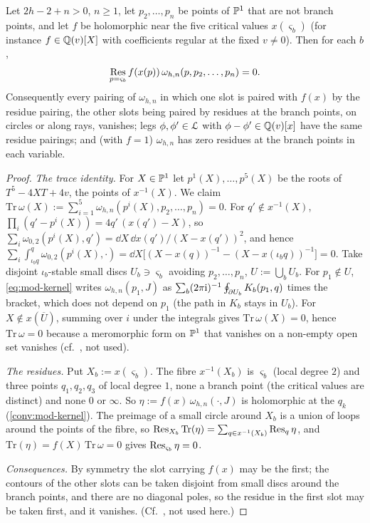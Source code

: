 \begin{lem}
\label{lem:mod-xfun}
Let $2h-2+n>0$, $n\geq 1$, let $p_2,\dots,p_n$ be points of $\mathbb{P}^1$ that are not branch points, and let $f$ be holomorphic near the five critical values $x(\varsigma_b)$ (for instance $f\in\mathbb{Q}(v)[X]$ with coefficients regular at the fixed $v\neq0$). Then for each $b$,
\[
\operatorname*{Res}_{p=\varsigma_b}f(x(p))\,\omega_{h,n}(p,p_2,\dots,p_n)=0 .
\]
Consequently every pairing of $\omega_{h,n}$ in which one slot is paired with $f(x)$ by the residue pairing, the other slots being paired by residues at the branch points, on circles or along rays, vanishes; legs $\phi,\phi'\in\mathcal{L}$ with $\phi-\phi'\in\mathbb{Q}(v)[x]$ have the same residue pairings; and (with $f=1$) $\omega_{h,n}$ has zero residues at the branch points in each variable.
\end{lem}

\begin{proof}
\emph{The trace identity.} For $X\in\mathbb{P}^1$ let $p^1(X),\dots,p^5(X)$ be the roots of $T^5-4XT+4v$, the points of $x^{-1}(X)$. We claim $\mathrm{Tr}\,\omega(X):=\sum_{i=1}^5\omega_{h,n}(p^i(X),p_2,\dots,p_n)=0$. For $q'\notin x^{-1}(X)$, $\prod_i(q'-p^i(X))=4q'\,(x(q')-X)$, so $\sum_i\omega_{0,2}(p^i(X),q')=\dd X\,\dd x(q')/(X-x(q'))^2$, and hence $\sum_i\int_{\iota_bq}^q\omega_{0,2}(p^i(X),\cdot)=\dd X\big[(X-x(q))^{-1}-(X-x(\iota_bq))^{-1}\big]=0$. Take disjoint $\iota_b$-stable small discs $U_b\ni\varsigma_b$ avoiding $p_2,\dots,p_n$, $U:=\bigcup_bU_b$. For $p_1\notin U$, \eqref{eq:mod-kernel} writes $\omega_{h,n}(p_1,J)$ as $\sum_b(2\pi\mathrm{i})^{-1}\oint_{\partial U_b}K_b(p_1,q)$ times the bracket, which does not depend on $p_1$ (the path in $K_b$ stays in $U_b$). For $X\notin x(\overline U)$, summing over $i$ under the integrals gives $\mathrm{Tr}\,\omega(X)=0$, hence $\mathrm{Tr}\,\omega=0$ because a meromorphic form on $\mathbb{P}^1$ that vanishes on a non-empty open set vanishes (cf.\ \cite[App.~A, (A-1), (A-5)]{Eynard:2007kz}, not used).

\emph{The residues.} Put $X_b:=x(\varsigma_b)$. The fibre $x^{-1}(X_b)$ is $\varsigma_b$ (local degree $2$) and three points $q_1,q_2,q_3$ of local degree $1$, none a branch point (the critical values are distinct) and none $0$ or $\infty$. So $\eta:=f(x)\,\omega_{h,n}(\cdot,J)$ is holomorphic at the $q_k$ (\cref{conv:mod-kernel}). The preimage of a small circle around $X_b$ is a union of loops around the points of the fibre, so $\operatorname*{Res}_{X_b}\mathrm{Tr}(\eta)=\sum_{q\in x^{-1}(X_b)}\operatorname*{Res}_q\eta$, and $\mathrm{Tr}(\eta)=f(X)\,\mathrm{Tr}\,\omega=0$ gives $\operatorname*{Res}_{\varsigma_b}\eta=0$.

\emph{Consequences.} By symmetry the slot carrying $f(x)$ may be the first; the contours of the other slots can be taken disjoint from small discs around the branch points, and there are no diagonal poles, so the residue in the first slot may be taken first, and it vanishes. (Cf.\ \cite[Thm.~4.4 (4-23), Cor.~4.1 (4-26)--(4-29), App.~A (A-25)]{Eynard:2007kz}, not used here.)
\end{proof}

